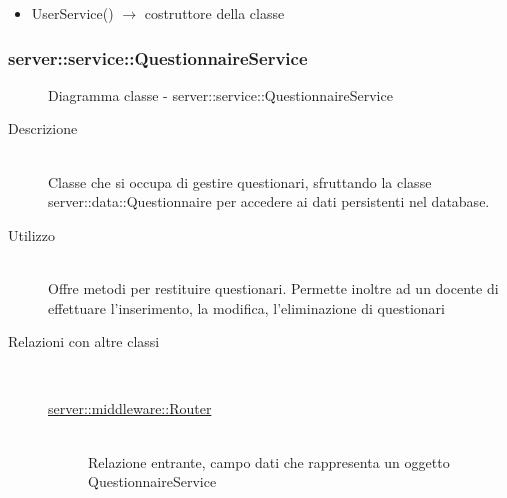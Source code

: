 \begin{description}
\begin{itemize}
	\item UserService() $\rightarrow$ costruttore della classe
\end{itemize}

\end{description}

\vspace{0.5cm}
\hypertarget{server::service::QuestionnaireService}{}
\subsubsection[QuestionnaireService]{server::service::QuestionnaireService}
\begin{figure}[H]
	\centering
	\caption{Diagramma classe - server::service::QuestionnaireService}
\end{figure}\begin{description}
\item[Descrizione] \hfill \\
Classe che si occupa di gestire questionari, sfruttando la classe server::data::Questionnaire per accedere ai dati persistenti nel database.
\item[Utilizzo] \hfill \\
Offre metodi per restituire questionari. Permette inoltre ad un docente di effettuare l'inserimento, la modifica, l'eliminazione di questionari
\item[Relazioni con altre classi] \hfill \\
\vspace{-7mm}
\begin{description}
	\item[\hyperlink{server::middleware::Router}{server::middleware::Router}] \hfill \\
	Relazione entrante, campo dati che rappresenta un oggetto QuestionnaireService
\end{description}


\end{description}
